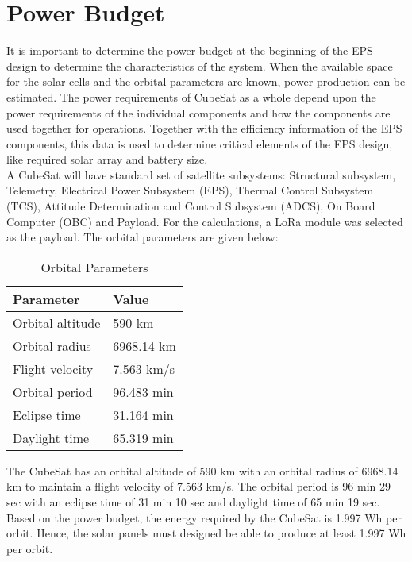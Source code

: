 \chapter{Power Budget}
\justifying
 It is important to determine the power budget at the beginning of the EPS design to determine the characteristics of the system. When the available space for the solar cells and the orbital parameters are known, power production can be estimated.
 The power requirements of CubeSat as a whole depend upon the power requirements of the individual components and how the components are used together for operations. Together with the efficiency information of the EPS components, this data is used to determine critical elements of the EPS design, like required solar array and battery size.
 \\
 A CubeSat will have standard set of satellite subsystems: Structural subsystem, Telemetry, Electrical Power Subsystem (EPS), Thermal Control Subsystem (TCS), Attitude Determination and Control Subsystem (ADCS), On Board Computer (OBC) and Payload. For the calculations, a LoRa module was selected as the payload. The orbital parameters are given below:
 
\begin{table}[]
	\begin{center}
	\begin{tabular}{|l|l|}
		\hline
		\textbf{Parameter} & \textbf{Value} \\ \hline
		Orbital altitude   & 590 km         \\ \hline
		Orbital radius     & 6968.14 km     \\ \hline
		Flight velocity    & 7.563 km/s     \\ \hline
		Orbital period     & 96.483 min     \\ \hline
		Eclipse time       & 31.164 min     \\ \hline
		Daylight time      & 65.319 min     \\ \hline
	\end{tabular}
\caption{Orbital Parameters}
\label{table:1}
\end{center}
\end{table}
 \pagebreak
The CubeSat has an orbital altitude of 590 km with an orbital radius of 6968.14 km to maintain a flight velocity of 7.563 km/s. The orbital period is 96 min 29 sec with an eclipse time of 31 min 10 sec and daylight time of 65 min 19 sec. Based on the power budget, the energy required by the CubeSat is 1.997 Wh per orbit. Hence, the solar panels must designed be able to produce at least 1.997 Wh per orbit.
 \\
 

